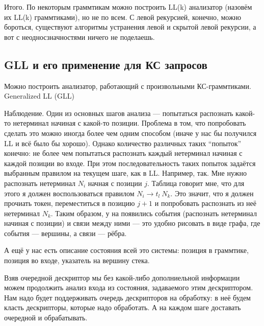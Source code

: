 Итого. По некоторым граммтикам можно построить LL(k) анализатор (назовём их LL(k) граммтиками), но не по всем.
С левой рекурсией, конечно, можно бороться, существуют алгоритмы устранения левой и скрытой левой рекурсии, а вот с неодносзначностями ничего не поделаешь.



\subsection{GLL и его применение для КС запросов}

Можно построить анализатор, работающий с произвольными КС-граммтиками.
Generalized LL (GLL)~\cite{Scott:2010:GP:1860132.1860320,10.1007/978-3-662-46663-6_5}

\begin{definition}
\end{definition}

Наблюдение. Один из основных шагов анализа --- попытаться распознать какой-то нетерминал начиная с какой-то позиции.
Проблема в том, что попробовать сделать это можно иногда более чем одним способом (иначе у нас бы получился LL и всё было бы хорошо). Однако количество различных таких ``попыток'' конечно: не более чем попытаться распознать каждый нетерминал начиная с каждой позиции во входе. При этом последовательность таких попыток задаётся выбранным правилом на текущем шаге, как в LL. Например, так. Мне нужно распознать нетерминал $N_i$ начная с позиции $j$. Таблица говорит мне, что для этого я должен воспользоваться правилом $N_i \to t_l \ N_k$. Это значит, что я должен прочиать токен, переместиться в позицию $j+1$ и попробовать распознать из неё нетерминал $N_k$. Таким образом, у на появились события (распознать нетерминал начиная с позиции) и связи между ними --- это удобно рисовать в виде графа, где события --- вершины, а связи --- рёбра.

А ещё у нас есть описание состояния всей это системы: позиция в граммтике, позиция во входе, указатель на вершину стека.

\begin{definition}[Дескриптор]
\end{definition}

Взяв очередной дескриптор мы без какой-либо дополниельной информации можем продолжить анализ входа из состояния, задаваемого этим дескриптором.
Нам надо будет поддерживать очередь дескрипторов на обработку: в неё будем класть дескрипторы, которые надо обработать. А на каждом шаге доставать очередной и обрабатывать.

